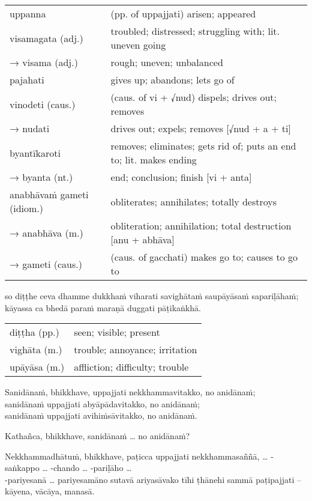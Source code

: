 \documentclass[11pt,oneside]{memoir}
\begin{document}
\begin{longtable}{L{\colOne} L{\colTwo}}
uppanna & (pp. of uppajjati) arisen; appeared\\[0pt]
visamagata (adj.) & troubled; distressed; struggling with; lit. uneven going\\[0pt]
→ visama (adj.) & rough; uneven; unbalanced\\[0pt]
pajahati & gives up; abandons; lets go of\\[0pt]
vinodeti (caus.) & (caus. of vi + √nud) dispels; drives out; removes\\[0pt]
→ nudati & drives out; expels; removes [√nud + a + ti]\\[0pt]
byantīkaroti & removes; eliminates; gets rid of; puts an end to; lit. makes ending\\[0pt]
→ byanta (nt.) & end; conclusion; finish [vi + anta]\\[0pt]
anabhāvaṁ gameti (idiom.) & obliterates; annihilates; totally destroys\\[0pt]
→ anabhāva (m.) & obliteration; annihilation; total destruction [anu + abhāva]\\[0pt]
→ gameti (caus.) & (caus. of gacchati) makes go to; causes to go to\\[0pt]
\end{longtable}

so diṭṭhe ceva dhamme dukkhaṁ viharati savighātaṁ saupāyāsaṁ sapariḷāhaṁ; \\[0pt]
kāyassa ca bhedā paraṁ maraṇā duggati pāṭikaṅkhā.

\begin{longtable}{L{\colOne} L{\colTwo}}
diṭṭha (pp.) & seen; visible; present\\[0pt]
vighāta (m.) & trouble; annoyance; irritation\\[0pt]
upāyāsa (m.) & affliction; difficulty; trouble\\[0pt]
\end{longtable}

Sanidānaṁ, bhikkhave, uppajjati nekkhammavitakko, no anidānaṁ; \\[0pt]
sanidānaṁ uppajjati abyāpādavitakko, no anidānaṁ; \\[0pt]
sanidānaṁ uppajjati avihiṁsāvitakko, no anidānaṁ.

Kathañca, bhikkhave, sanidānaṁ \ldots{} no anidānaṁ?

Nekkhammadhātuṁ, bhikkhave, paṭicca uppajjati nekkhammasaññā,
\ldots{} -saṅkappo \ldots{} -chando \ldots{} -pariḷāho \ldots{} \\[0pt]
-pariyesanā \ldots{} pariyesamāno sutavā ariyasāvako
tīhi ṭhānehi sammā paṭipajjati -- kāyena, vācāya, manasā.
\end{document}

